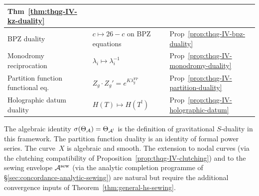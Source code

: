 \begin{center}
\begin{tabular}{|>{\raggedright\arraybackslash}p{5.5cm}|%
 >{\raggedright\arraybackslash}p{5.5cm}|%
 >{\raggedright\arraybackslash}p{3cm}|}
Thm~\ref{thm:thqg-IV-kz-duality} \\
\hline
BPZ duality &
$c \mapsto 26-c$ on BPZ equations &
Prop~\ref{prop:thqg-IV-bpz-duality} \\
\hline
Monodromy reciprocation &
$\lambda_i \mapsto \lambda_i^{-1}$ &
Prop~\ref{prop:thqg-IV-monodromy-duality} \\
\hline
Partition function functional eq. &
$Z_g \cdot Z_g' = e^{K\lambda_g^{\mathrm{FP}}}$ &
Prop~\ref{prop:thqg-IV-partition-duality} \\
\hline
Holographic datum duality &
$H(T) \mapsto H(T^!)$ &
Prop~\ref{prop:thqg-IV-holographic-datum} \\
\hline
\end{tabular}
\end{center}

\begin{remark}
\label{rem:thqg-IV-scope}
The algebraic identity $\sigma(\Theta_{\mathcal{A}}) = \Theta_{\mathcal{A}^!}$ is the
definition of gravitational $S$-duality in this framework. The
partition function duality is an identity of formal power series.
The curve~$X$ is algebraic and smooth. The extension to nodal
curves (via the clutching compatibility of
Proposition~\ref{prop:thqg-IV-clutching}) and to the sewing envelope
$\mathcal{A}^{\mathrm{sew}}$ (via the analytic completion programme of
\S\ref{sec:concordance-analytic-sewing}) are natural but require
the additional convergence inputs of Theorem~\ref{thm:general-hs-sewing}.
\end{remark}
